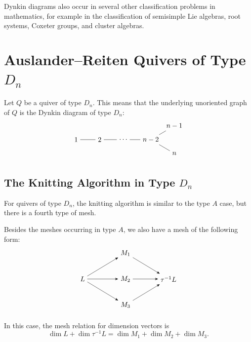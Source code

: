 \documentclass[11pt, a4paper]{report}
\begin{document}
\begin{remark}
    Dynkin diagrams also occur in several other classification problems in
    mathematics, for example in the classification of semisimple Lie algebras,
    root systems, Coxeter groups, and cluster algebras.
\end{remark}

\section{Auslander--Reiten Quivers of Type \texorpdfstring{\(D_n\)}{Dn}}

Let \(Q\) be a quiver of type \(D_n\). This means that the underlying unoriented
graph of \(Q\) is the Dynkin diagram of type \(D_n\):
\[
\begin{tikzpicture}[>=Stealth,scale=1]
    \node (1) at (0,0) {\(1\)};
    \node (2) at (1.2,0) {\(2\)};
    \node (dots) at (2.4,0) {\(\cdots\)};
    \node (n2) at (3.8,0) {\(n-2\)};
    \node (n1) at (5,0.7) {\(n-1\)};
    \node (n) at (5,-0.7) {\(n\)};

    \draw (1) -- (2);
    \draw (2) -- (dots);
    \draw (dots) -- (n2);
    \draw (n2) -- (n1);
    \draw (n2) -- (n);
\end{tikzpicture}
\]

\subsection{The Knitting Algorithm in Type \texorpdfstring{\(D_n\)}{Dn}}

For quivers of type \(D_n\), the knitting algorithm is similar to the type \(A\)
case, but there is a fourth type of mesh.

Besides the meshes occurring in type \(A\), we also have a mesh of the following
form:
\[
\begin{tikzpicture}[>=Stealth,scale=1.1]
    \node (L) at (0,0) {\(L\)};
    \node (M1) at (2,1.2) {\(M_1\)};
    \node (M2) at (2,0) {\(M_2\)};
    \node (M3) at (2,-1.2) {\(M_3\)};
    \node (T) at (4,0) {\(\tau^{-1}L\)};

    \draw[->] (L) -- (M1);
    \draw[->] (L) -- (M2);
    \draw[->] (L) -- (M3);

    \draw[->] (M1) -- (T);
    \draw[->] (M2) -- (T);
    \draw[->] (M3) -- (T);
\end{tikzpicture}
\]

In this case, the mesh relation for dimension vectors is
\[
    \dim L+\dim \tau^{-1}L
    =
    \dim M_1+\dim M_2+\dim M_3.
\]
\end{document}
